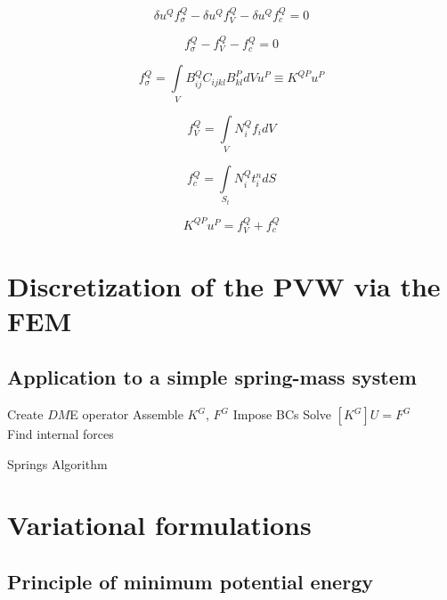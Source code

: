 \[\delta {u^Q}f_\sigma ^Q - \delta {u^Q}f_V^Q - \delta {u^Q}f_c^Q = 0\]

\[f_\sigma ^Q - f_V^Q - f_c^Q = 0\]

\[f_\sigma ^Q = \int\limits_V {B_{ij}^Q{C_{ijkl}}B_{kl}^PdV{u^P} \equiv {K^{QP}}} {u^P}\]

\[f_V^Q = \int\limits_V {N_i^Q{f_i}dV} \]

\[f_c^Q = \int\limits_{{S_t}} {N_i^Qt_i^ndS} \]

\[{K^{QP}}{u^P} = f_V^Q + f_c^Q\]

\section[Discretization of the PVW using FEM]{Discretization of the PVW via the FEM}

\subsection*{Application to a simple spring-mass system}


\begin{algorithm}[H]
 \SetAlgoLined
 Create $DM$E operator\;
 Assemble $K^G$, $F^G$\;
Impose BCs\;
Solve $[K^G]U=F^G$\\
Find internal forces
\caption{Springs Algorithm}
\end{algorithm}


\section{Variational formulations}

\subsection{Principle of minimum potential energy}

